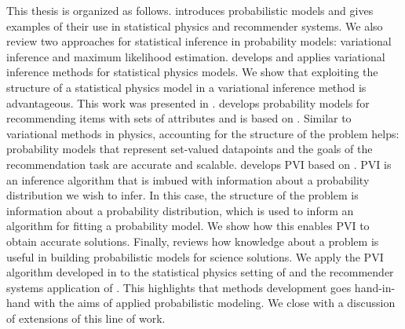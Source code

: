 This thesis is organized as follows.  introduces probabilistic models and gives examples of their use in statistical physics and recommender systems. We also review two approaches for statistical inference in probability models: variational inference and maximum likelihood estimation.  develops and applies variational inference methods for statistical physics models. We show that exploiting the structure of a statistical physics model in a variational inference method is advantageous. This work was presented in \citet{altosaar2019hierarchical}.  develops probability models for recommending items with sets of attributes and is based on \citet{altosaar2020rankfromsets:}. Similar to variational methods in physics, accounting for the structure of the problem helps: probability models that represent set-valued datapoints and the goals of the recommendation task are accurate and scalable.  develops \gls{PVI} based on \citet{altosaar2018proximity}. \gls{PVI} is an inference algorithm that is imbued with information about a probability distribution we wish to infer. In this case, the structure of the problem is information about a probability distribution, which is used to inform an algorithm for fitting a probability model. We show how this enables \gls{PVI} to obtain accurate solutions. Finally,  reviews how knowledge about a problem is useful in building probabilistic models for science solutions. We apply the \gls{PVI} algorithm developed in  to the statistical physics setting of  and the recommender systems application of . This highlights that methods development goes hand-in-hand with the aims of applied probabilistic modeling. We close with a discussion of extensions of this line of work.

